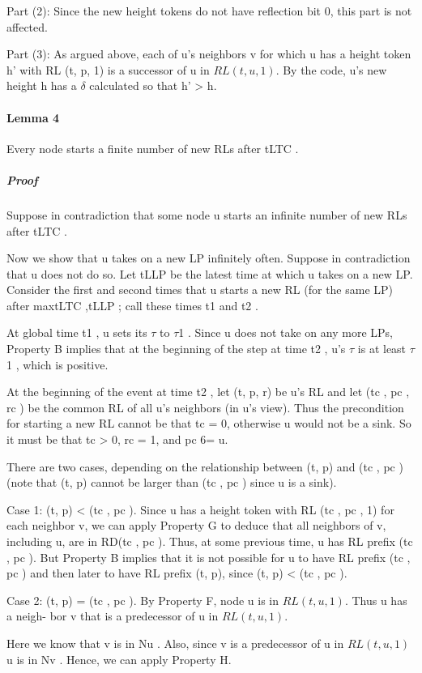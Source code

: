 Part (2): Since the new height tokens do not have reflection bit 0, this part is not affected.

Part (3): As argued above, each of u's neighbors v for which u has a height token h' with RL (t, p, 1) is a successor of u in $RL (t, u, 1)$. By the code, u's new height h has a $\delta$ calculated so that h' > h.
\paragraph{Lemma 4} Every node starts a finite number of new RLs after tLTC .

\subparagraph{Proof} Suppose in contradiction that some node u starts an infinite number of new RLs after tLTC .

Now we show that u takes on a new LP infinitely often. Suppose in contradiction that u does not do so. Let tLLP be the latest time at which u takes on a new LP. Consider the first and second times that u starts a new RL (for the same LP) after max{tLTC ,tLLP }; call these times t1 and t2 .

At global time t1 , u sets its $\tau$ to $\tau$1 . Since u does not take on any more LPs, Property B implies that at the beginning of the step at time t2 , u’s $\tau$ is at least $\tau$1 , which is positive.

At the beginning of the event at time t2 , let (t, p, r) be u’s RL and let (tc , pc , rc ) be the common RL of all u’s neighbors (in u’s view). Thus the precondition for starting a new RL cannot be that tc = 0, otherwise u would not be a sink. So it must be that tc > 0, rc = 1, and pc 6= u.

There are two cases, depending on the relationship between (t, p) and (tc , pc ) (note that (t, p) cannot be larger than (tc , pc ) since u is a sink).

Case 1: (t, p) < (tc , pc ). Since u has a height token with RL (tc , pc , 1) for each neighbor v, we can apply Property G to deduce that all neighbors of v, including u, are in RD(tc , pc ). Thus, at some previous time, u has RL prefix (tc , pc ). But Property B implies that it is not possible for u to have RL prefix (tc , pc ) and then later to have RL prefix (t, p), since (t, p) < (tc , pc ).

Case 2: (t, p) = (tc , pc ). By Property F, node u is in $RL (t, u, 1)$. Thus u has a neigh- bor v that is a predecessor of u in $RL (t, u, 1)$.

Here we know that v is in Nu . Also, since v is a predecessor of u in $RL (t, u, 1)$ u is in Nv . Hence, we can apply Property H.

